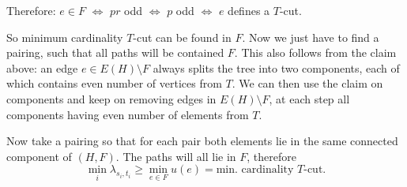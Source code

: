 \begin{exercise}{2}
\begin{proof_claim}
        Therefore: $e \in F$ $\Leftrightarrow$ $pr$ odd $\Leftrightarrow$ $p$
        odd $\Leftrightarrow$ $e$ defines a $T$-cut.
    \end{proof_claim}

    So minimum cardinality $T$-cut can be found in $F$. Now we just have to find
    a pairing, such that all paths will be contained $F$. This also follows from
    the claim above: an edge $e \in E(H) \setminus F$ always splits the tree
    into two components, each of which contains even number of vertices from
    $T$. We can then use the claim on components and keep on removing edges in
    $E(H) \setminus F$, at each step all components having even number of
    elements from $T$.

    Now take a pairing so that for each pair both elements lie in the same
    connected component of $(H, F)$. The paths will all lie in $F$, therefore
    \begin{equation*}
        \min_i \lambda_{s_i, t_i} \geq \min_{e \in F} u(e) = \text{min.
        cardinality $T$-cut}.
    \end{equation*}
\end{exercise}

